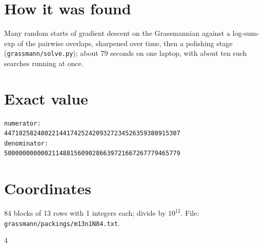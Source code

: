 \documentclass[11pt,a4paper]{article}
\begin{document}
\section{How it was found}
Many random starts of gradient descent on the Grassmannian against a log-sum-exp of the pairwise overlaps, sharpened over time, then a polishing stage (\texttt{grassmann/solve.py}); about 79 seconds on one laptop, with about ten such searches running at once.


\appendix
\section{Exact value}
{\small
\begin{verbatim}
numerator:
447102582480221441742524209327234526359380915307
denominator:
500000000000211488156090286639721667267779465779
\end{verbatim}}

\section{Coordinates}
84 blocks of 13 rows with 1 integers each; divide by $10^{12}$. File: \texttt{grassmann/packings/m13n1N84.txt}.
{\tiny
\begin{multicols}{4}
\end{multicols}}
\end{document}
